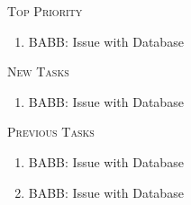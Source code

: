 
\large
\textsc{Top Priority}
\normalsize
\begin{enumerate}
\item {} BABB: Issue with Database
\end{enumerate}\vspace{.5cm}
\large
\textsc{New Tasks}
\normalsize
\begin{enumerate}
\item {} BABB: Issue with Database
\end{enumerate}\vspace{.5cm}
\large
\textsc{Previous Tasks}
\normalsize
\begin{enumerate}
\item {} BABB: Issue with Database
\item {} BABB: Issue with Database
\end{enumerate}


